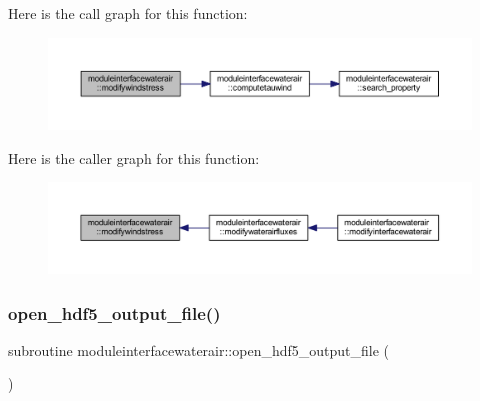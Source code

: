 Here is the call graph for this function\+:\nopagebreak
\begin{figure}[H]
\begin{center}
\leavevmode
\includegraphics[width=350pt]{namespacemoduleinterfacewaterair_a09c4f1b7db1459cc4893f784b8310831_cgraph}
\end{center}
\end{figure}
Here is the caller graph for this function\+:\nopagebreak
\begin{figure}[H]
\begin{center}
\leavevmode
\includegraphics[width=350pt]{namespacemoduleinterfacewaterair_a09c4f1b7db1459cc4893f784b8310831_icgraph}
\end{center}
\end{figure}
\mbox{\label{namespacemoduleinterfacewaterair_a48080272c5d72deaf3fe655740d02ccc}} 
\subsubsection{\texorpdfstring{open\+\_\+hdf5\+\_\+output\+\_\+file()}{open\_hdf5\_output\_file()}}
{\footnotesize\ttfamily subroutine moduleinterfacewaterair\+::open\+\_\+hdf5\+\_\+output\+\_\+file (\begin{DoxyParamCaption}{ }\end{DoxyParamCaption})\hspace{0.3cm}{\ttfamily [private]}}

